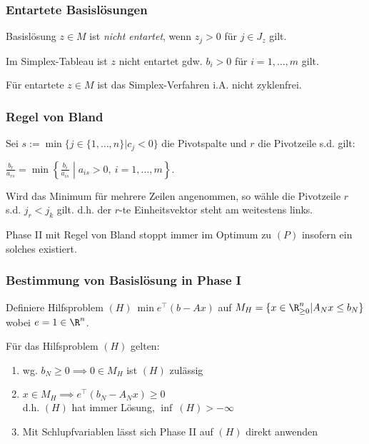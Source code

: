 \subsubsection*{Entartete Basislösungen}

Basislösung \(z \in M\) ist \emph{nicht entartet}, wenn \(z_j > 0\) für \(j \in J_z\) gilt.

Im Simplex-Tableau ist \(z\) nicht entartet gdw. \(b_i > 0\) für \(i=1,\dots,m\) gilt.

Für entartete \(z \in M\) ist das Simplex-Verfahren i.A. nicht zyklenfrei.

\subsubsection*{Regel von Bland}

Sei \(s := \min \{ j \in \{1,\dots,n\} | c_j < 0 \}\) die Pivotspalte und \(r\) die Pivotzeile s.d. gilt:

\(\frac{b_r}{a_{rs}} = \min \left\{ \frac{b_i}{a_{is}} \middle| a_{is} > 0, \ i=1,\dots,m \right\}\).

Wird das Minimum für mehrere Zeilen angenommen, so wähle die Pivotzeile \(r\) s.d. \(j_r < j_k\) gilt. d.h. der \(r\)-te Einheitsvektor steht am weitestens links.

\spacing

Phase II mit Regel von Bland stoppt immer im Optimum zu \((P)\) insofern ein solches existiert.

\subsubsection*{Bestimmung von Basislösung in Phase I}

Definiere Hilfsproblem \((H) \ \min e^\top (b-Ax)\) auf \(M_H = \{ x \in \R_{\geq 0}^n | A_N x \leq b_N \}\) wobei \(e = 1 \in \R^n\).

Für das Hilfsproblem \((H)\) gelten:

\begin{enumerate}[label=(\alph*)]
	\item wg. \(b_N \geq 0 \implies 0 \in M_H\) ist \((H)\) zulässig
	\item \(x \in M_H \implies e^\top (b_N - A_N x) \geq 0\) \\ d.h. \((H)\) hat immer Lösung, \(\inf \ (H) > -\infty\)
	\item Mit Schlupfvariablen lässt sich Phase II auf \((H)\) direkt anwenden
\end{enumerate}

